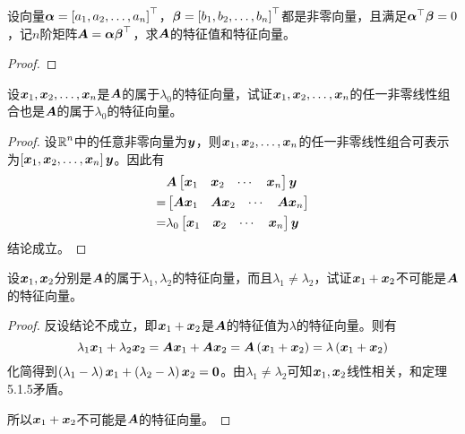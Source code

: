 \begin{problem}
设向量\(\vecal=\myvec{\enums{a}{n}}\)，\(\vecbeta=\myvec{\enums{b}{n}}\)都是非零向量，且满足\(\vecal^\top\vecbeta=0\)，记\(n\)阶矩阵\(\mata=\vecal\vecbeta^\top\)，求\(\mata\)的特征值和特征向量。
\end{problem}
\begin{proof}
\end{proof}

\begin{problem}
设\(\enums{\vecx}{n}\)是\(\mata\)的属于\(\lambda_0\)的特征向量，试证\(\enums{\vecx}{n}\)的任一非零线性组合也是\(\mata\)的属于\(\lambda_0\)的特征向量。
\end{problem}
\begin{proof}
    设\(\rea^n\)中的任意非零向量为\(\vecy\)，则\(\enums{\vecx}{n}\)的任一非零线性组合可表示为\(\mat{\enums{\vecx}{n}}\vecy\)。因此有
    \begin{align*}
          & \mata\begin{bmatrix}\vecx_1&\vecx_2&\cdots&\vecx_n\end{bmatrix}\vecy      \\
        = & \begin{bmatrix}\mata\vecx_1&\mata\vecx_2&\cdots&\mata\vecx_n\end{bmatrix} \\
        = & \lambda_0\begin{bmatrix}\vecx_1&\vecx_2&\cdots&\vecx_n\end{bmatrix}\vecy
    \end{align*}
    结论成立。
\end{proof}

\begin{problem}
设\(\vecx_1,\vecx_2\)分别是\(\mata\)的属于\(\lambda_1,\lambda_2\)的特征向量，而且\(\lambda_1\neq\lambda_2\)，试证\(\vecx_1+\vecx_2\)不可能是\(\mata\)的特征向量。
\end{problem}
\begin{proof}
    反设结论不成立，即\(\vecx_1+\vecx_2\)是\(\mata\)的特征值为\(\lambda\)的特征向量。则有
    \begin{equation*}
        \lambda_1\vecx_1+\lambda_2\vecx_2=\mata\vecx_1+\mata\vecx_2=\mata\mypar{\vecx_1+\vecx_2}=\lambda\mypar{\vecx_1+\vecx_2}
    \end{equation*}
    化简得到\(\mypar{\lambda_1-\lambda}\vecx_1+\mypar{\lambda_2-\lambda}\vecx_2=\veczero\)。由\(\lambda_1\neq\lambda_2\)可知\(\vecx_1,\vecx_2\)线性相关，和定理5.1.5矛盾。

    所以\(\vecx_1+\vecx_2\)不可能是\(\mata\)的特征向量。
\end{proof}

